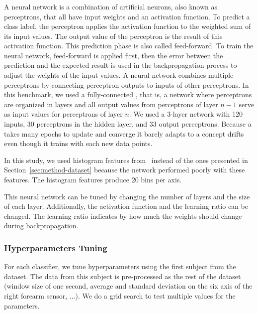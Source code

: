 \subsubsection{\FNN}
\label{sec:method-fnn}
A neural network is a combination of artificial
neurons, also known as perceptrons, that all have input weights and an
activation function. To predict a class label, the
perceptron applies the activation function to the weighted sum
of its input values. The output
value of the perceptron is the result of this
activation function. This prediction phase is also
called feed-forward. To train the neural network,
feed-forward is applied first, then the error between the
prediction and the expected result is used in the
backpropagation process to adjust the weights of
the input values.  A neural network combines
multiple perceptrons by connecting perceptron outputs
to inputs of other perceptrons.  In
this benchmark, we used a fully-connected \FNN, 
that is, a network where perceptrons are organized in
layers and all output
values from perceptrons of layer $n-1$ serve as
input values for perceptrons of layer $n$. 
We used a 3-layer network with 120 inputs, 30
perceptrons in the hidden layer, and 33 output
perceptrons.
Because a \FNN takes many epochs to update and
converge it barely adapts to a concept drifts even
though it trains with each new data points.

In this study, we used histogram features
from~\cite{omid_2019} instead of the ones
presented in Section~\ref{sec:method-dataset}
because the network performed
poorly with these features. The histogram features
produce 20 bins per axis.

This neural network can be tuned by changing the
number of layers and the size of each layer.
Additionally, the activation function and the
learning ratio can be changed. The learning ratio
indicates by how much the weights should change
during backpropagation.

\subsubsection{Hyperparameters Tuning}
For each classifier, we tune hyperparameters  using the first
subject from the \banosdataset dataset.  The data from
this subject is pre-processed as the rest of
the \banosdataset dataset (window size of one second,
average and standard deviation on the six
axis of the right forearm sensor,
$\ldots$). We do a grid search to test multiple values for the
parameters.

